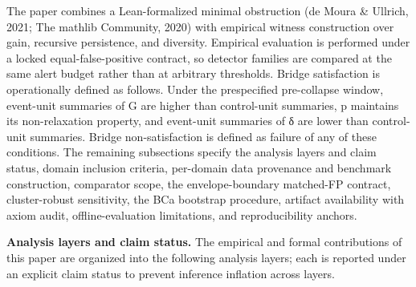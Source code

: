 \documentclass[
  11pt,
]{article}
\begin{document}
The paper combines a Lean-formalized minimal obstruction (de Moura \&
Ullrich, 2021; The mathlib Community, 2020) with empirical witness
construction over gain, recursive persistence, and diversity. Empirical
evaluation is performed under a locked equal-false-positive contract, so
detector families are compared at the same alert budget rather than at
arbitrary thresholds. Bridge satisfaction is operationally defined as
follows. Under the prespecified pre-collapse window, event-unit
summaries of G are higher than control-unit summaries, p maintains its
non-relaxation property, and event-unit summaries of δ are lower than
control-unit summaries. Bridge non-satisfaction is defined as failure of
any of these conditions. The remaining subsections specify the analysis
layers and claim status, domain inclusion criteria, per-domain data
provenance and benchmark construction, comparator scope, the
envelope-boundary matched-FP contract, cluster-robust sensitivity, the
BCa bootstrap procedure, artifact availability with axiom audit,
offline-evaluation limitations, and reproducibility anchors.

\textbf{Analysis layers and claim status.} The empirical and formal
contributions of this paper are organized into the following analysis
layers; each is reported under an explicit claim status to prevent
inference inflation across layers.
\end{document}
